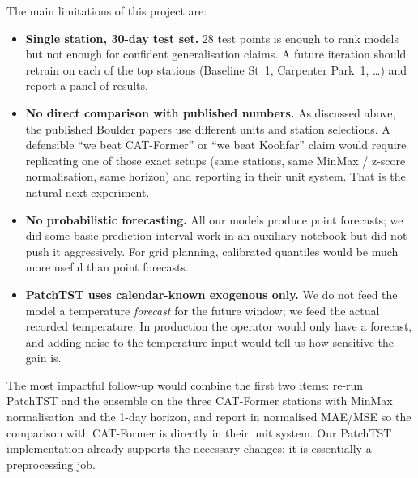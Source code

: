 The main limitations of this project are:
\begin{itemize}[leftmargin=*]
    \item \textbf{Single station, 30-day test set.} 28 test points is
    enough to rank models but not enough for confident generalisation
    claims. A future iteration should retrain on each of the top
    stations (Baseline St~1, Carpenter Park~1, \dots) and report a
    panel of results.
    \item \textbf{No direct comparison with published numbers.} As
    discussed above, the published Boulder papers use different units
    and station selections. A defensible ``we beat CAT-Former'' or
    ``we beat Koohfar'' claim would require replicating one of those
    exact setups (same stations, same MinMax / z-score normalisation,
    same horizon) and reporting in their unit system. That is the
    natural next experiment.
    \item \textbf{No probabilistic forecasting.} All our models
    produce point forecasts; we did some basic prediction-interval
    work in an auxiliary notebook but did not push it aggressively.
    For grid planning, calibrated quantiles would be much more useful
    than point forecasts.
    \item \textbf{PatchTST uses calendar-known exogenous only.} We do
    not feed the model a temperature \emph{forecast} for the future
    window; we feed the actual recorded temperature. In production
    the operator would only have a forecast, and adding noise to the
    temperature input would tell us how sensitive the gain is.
\end{itemize}

The most impactful follow-up would combine the first two items:
re-run PatchTST and the ensemble on the three CAT-Former stations
with MinMax normalisation and the 1-day horizon, and report in
normalised MAE/MSE so the comparison with CAT-Former is directly in
their unit system. Our PatchTST implementation already supports the
necessary changes; it is essentially a preprocessing job.
